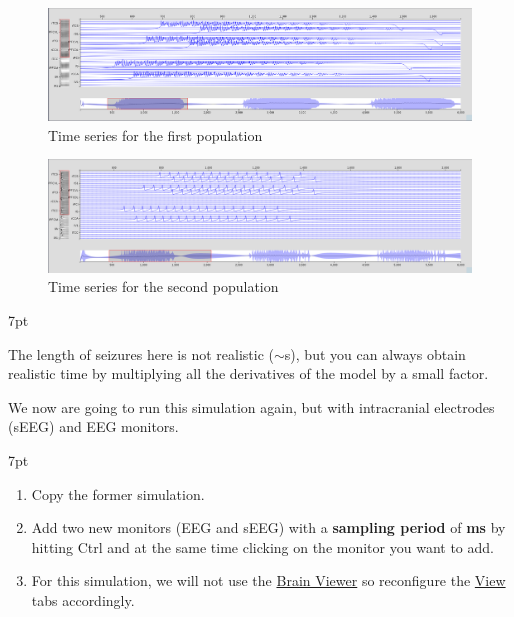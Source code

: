 \documentclass{tufte-handout}
\newenvironment{simulation}{%
  \def\FrameCommand{%
    \hspace{1pt}%
    {\color{ForestGreen}\vrule width 2pt}%
    {\color{simulationshade}\vrule width 4pt}%
    \colorbox{simulationshade}%
  }%
  \MakeFramed{\advance\hsize-\width\FrameRestore}%
  \noindent\hspace{-4.55pt}%
  \begin{adjustwidth}{}{7pt}%
  \vspace{2pt}\vspace{2pt}%
}
{%
  \vspace{2pt}\end{adjustwidth}\endMakeFramed%
}
\newenvironment{blah}{%
  \def\FrameCommand{%
    \hspace{1pt}%
    {\color{DarkOrange}\vrule width 2pt}%
    {\color{PeachPuff}\vrule width 4pt}%
    \colorbox{PeachPuff}%
  }%
  \MakeFramed{\advance\hsize-\width\FrameRestore}%
  \noindent\hspace{-4.55pt}%
  \begin{adjustwidth}{}{7pt}%
  \vspace{2pt}\vspace{2pt}%
}
{%
  \vspace{2pt}\end{adjustwidth}\endMakeFramed%
}
\begin{document}
\begin{figure}[h]
  \includegraphics[width=\linewidth]{Handout_UI_ModellingAnEpilepticPatient_FirstPopulationTimeSeries}%
  \caption{Time series for the first population}%
  \label{fig:first_pop}%
\end{figure}



\begin{figure}[h]
  \includegraphics[width=\linewidth]{Handout_UI_ModellingAnEpilepticPatient_SecondPopulationTimeSeries}%
  \caption{Time series for the second population}%
  \label{fig:second_pop}%
\end{figure}

\begin{blah}
  \begin{enumerate}[resume]
  The length of seizures here is not realistic ($\sim$\unit[2]{s}), but you can always obtain realistic time by multiplying
  all the derivatives of the model by a small factor.
  \end{enumerate}
\end{blah}
We now are going to run this simulation again, but with intracranial electrodes (sEEG) and EEG monitors.

\begin{simulation}
  \begin{enumerate}
  \item Copy the former simulation.
  \item Add two new monitors (EEG and sEEG) with a \textbf{sampling period} of \textbf{\unit[1]{ms}} by hitting Ctrl and at the same time clicking on the monitor you want to add.
  \item For this simulation, we will not use the \underline{Brain Viewer} so reconfigure the \underline{View} tabs accordingly.
\end{enumerate}
\end{simulation}
\end{document}
